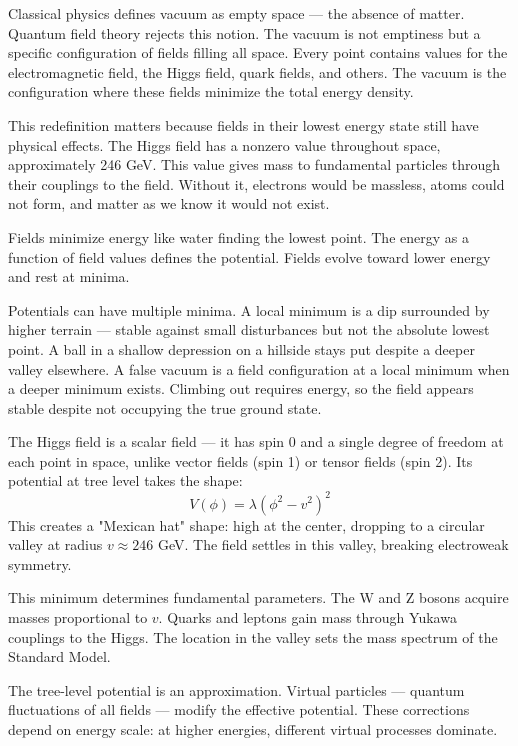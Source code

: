 
Classical physics defines vacuum as empty space — the absence of matter. Quantum field theory rejects this notion. The vacuum is not emptiness but a specific configuration of fields filling all space. Every point contains values for the electromagnetic field, the Higgs field, quark fields, and others. The vacuum is the configuration where these fields minimize the total energy density.

This redefinition matters because fields in their lowest energy state still have physical effects. The Higgs field has a nonzero value throughout space, approximately 246 GeV. This value gives mass to fundamental particles through their couplings to the field. Without it, electrons would be massless, atoms could not form, and matter as we know it would not exist.

Fields minimize energy like water finding the lowest point. The energy as a function of field values defines the potential. Fields evolve toward lower energy and rest at minima.

Potentials can have multiple minima. A local minimum is a dip surrounded by higher terrain — stable against small disturbances but not the absolute lowest point. A ball in a shallow depression on a hillside stays put despite a deeper valley elsewhere. A false vacuum is a field configuration at a local minimum when a deeper minimum exists. Climbing out requires energy, so the field appears stable despite not occupying the true ground state.

The Higgs field is a scalar field — it has spin 0 and a single degree of freedom at each point in space, unlike vector fields (spin 1) or tensor fields (spin 2). Its potential at tree level takes the shape:
\[
V(\phi) = \lambda(\phi^2 - v^2)^2
\]
This creates a "Mexican hat" shape: high at the center, dropping to a circular valley at radius $v \approx 246$ GeV. The field settles in this valley, breaking electroweak symmetry.

This minimum determines fundamental parameters. The W and Z bosons acquire masses proportional to $v$. Quarks and leptons gain mass through Yukawa couplings to the Higgs. The location in the valley sets the mass spectrum of the Standard Model.

The tree-level potential is an approximation. Virtual particles — quantum fluctuations of all fields — modify the effective potential. These corrections depend on energy scale: at higher energies, different virtual processes dominate.

